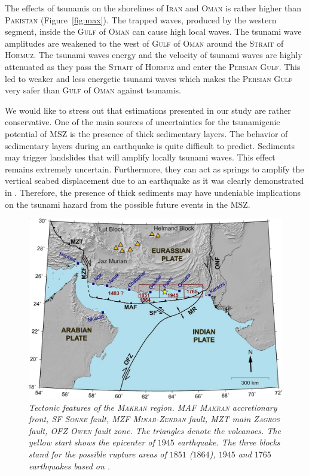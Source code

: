 \documentclass[12pt]{llncs}
\begin{document}
The effects of tsunamis on the shorelines of \textsc{Iran} and \textsc{Oman} is rather higher than \textsc{Pakistan} (Figure~\ref{fig:max}). The trapped waves, produced by the western segment, inside the \textsc{Gulf} of \textsc{Oman} can cause high local waves. The tsunami wave amplitudes are weakened to the west of \textsc{Gulf} of \textsc{Oman} around the \textsc{Strait} of \textsc{Hormuz}. The tsunami waves energy and the velocity of tsunami waves are highly attenuated as they pass the \textsc{Strait} of \textsc{Hormuz} and enter the \textsc{Persian Gulf}. This led to weaker and less energetic tsunami waves which makes the \textsc{Persian Gulf} very safer than \textsc{Gulf} of \textsc{Oman} against tsunamis.

We would like to stress out that estimations presented in our study are rather conservative. One of the main sources of uncertainties for the tsunamigenic potential of MSZ is the presence of thick sedimentary layers. The behavior of sedimentary layers during an earthquake is quite difficult to predict. Sediments may trigger landslides that will amplify locally tsunami waves. This effect remains extremely uncertain. Furthermore, they can act as springs to amplify the vertical seabed displacement due to an earthquake as it was clearly demonstrated in \citep{Dutykh2010}. Therefore, the presence of thick sediments may have undeniable implications on the tsunami hazard from the possible future events in the MSZ. 

%
\begin{figure}
\centering
\includegraphics[scale=4]{Fig1.jpg}
\caption{\small\em Tectonic features of the \textsc{Makran} region. \textit{MAF} \textsc{‫‪Makran}‬‬ ‫accretionary‬‬ front‬‬, \textit{SF} \textsc{Sonne} fault, \textit{MZF} ‫\textsc{‪Minab-Zendan}‬‬ fault,
\textit{MZT} ‫main \textsc{‫‪Zagros}‬‬ fault‬‬, \textit{OFZ}‬‬ \textsc{‫‪Owen}‬‬ fault‬‬ ‫zone‬‬. The triangles denote the volcanoes. The yellow start shows the epicenter of $1945$ earthquake. The three blocks stand for the possible rupture areas of $1851$ ($1864$), $1945$ and $1765$ earthquakes based on \cite{JGRB:JGRB8463}.}
\label{fig:Makran}
\end{figure}
\end{document}
